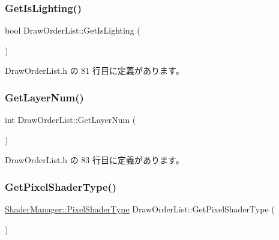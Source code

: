 \subsubsection{\texorpdfstring{Get\+Is\+Lighting()}{GetIsLighting()}}
{\footnotesize\ttfamily bool Draw\+Order\+List\+::\+Get\+Is\+Lighting (\begin{DoxyParamCaption}{ }\end{DoxyParamCaption})\hspace{0.3cm}{\ttfamily [inline]}}



 Draw\+Order\+List.\+h の 81 行目に定義があります。

\mbox{\label{class_draw_order_list_a28c14812ea793a3f3d752d58ccb481b2}} 
\subsubsection{\texorpdfstring{Get\+Layer\+Num()}{GetLayerNum()}}
{\footnotesize\ttfamily int Draw\+Order\+List\+::\+Get\+Layer\+Num (\begin{DoxyParamCaption}{ }\end{DoxyParamCaption})\hspace{0.3cm}{\ttfamily [inline]}}



 Draw\+Order\+List.\+h の 83 行目に定義があります。

\mbox{\label{class_draw_order_list_ab5f9a610bc9304a701d0f1fbaa3292fa}} 
\subsubsection{\texorpdfstring{Get\+Pixel\+Shader\+Type()}{GetPixelShaderType()}}
{\footnotesize\ttfamily \mbox{\hyperlink{class_shader_manager_a7d15d773b3c6a99dd7086c45c8b0be5f}{Shader\+Manager\+::\+Pixel\+Shader\+Type}} Draw\+Order\+List\+::\+Get\+Pixel\+Shader\+Type (\begin{DoxyParamCaption}{ }\end{DoxyParamCaption})\hspace{0.3cm}{\ttfamily [inline]}}



